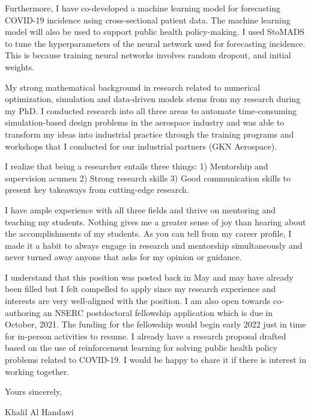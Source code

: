 \documentclass[12pt]{article} %
\begin{document}
\medskip %

Furthermore, I have co-developed a machine learning model for forecasting COVID-19 incidence using cross-sectional patient data. The machine learning model will also be used to support public health policy-making. I used StoMADS to tune the hyperparameters of the neural network used for forecasting incidence. This is because training neural networks involves random dropout, and initial weights.

\medskip %

My strong mathematical background in research related to numerical optimization, simulation and data-driven models stems from my research during my PhD. I conducted research into all three areas to automate time-consuming simulation-based design problems in the aerospace industry and was able to transform my ideas into industrial practice through the training programs and workshops that I conducted for our industrial partners (GKN Aerospace).

\medskip %

I realize that being a researcher entails three things: 1) Mentorship and supervision acumen 2) Strong research skills 3) Good communication skills to present key takeaways from cutting-edge research.

\medskip %

I have ample experience with all three fields and thrive on mentoring and teaching my students. Nothing gives me a greater sense of joy than hearing about the accomplishments of my students. As you can tell from my career profile, I made it a habit to always engage in research and mentorship simultaneously and never turned away anyone that asks for my opinion or guidance.

\medskip %

I understand that this position was posted back in May and may have already been filled but I felt compelled to apply since my research experience and interests are very well-aligned with the position. I am also open towards co-authoring an NSERC postdoctoral fellowship application which is due in October, 2021. The funding for the fellowship would begin early 2022 just in time for in-person activities to resume. I already have a research proposal drafted based on the use of reinforcement learning for solving public health policy problems related to COVID-19. I would be happy to share it if there is interest in working together.

\medskip %

Yours sincerely,

\medskip %

Khalil Al Handawi

\medskip %

\end{document}
